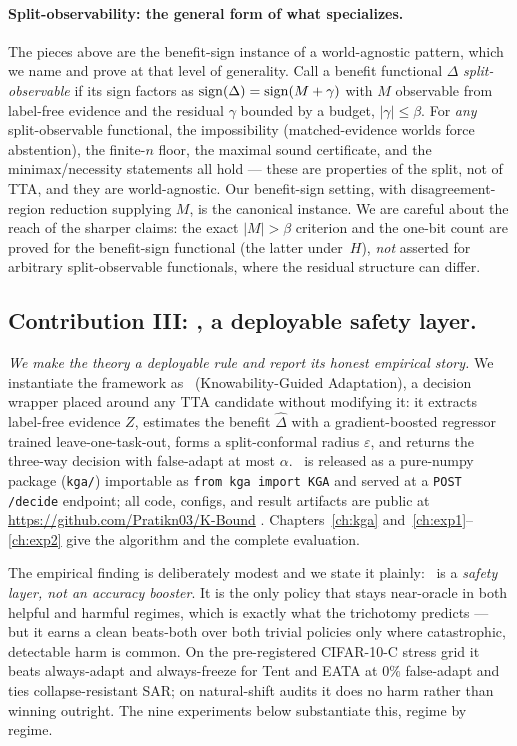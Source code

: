 \paragraph{Split-observability: the general form of what specializes.}
The pieces above are the benefit-sign instance of a world-agnostic pattern, which we
name and prove at that level of generality. Call a benefit functional $\Delta$
\emph{split-observable} if its sign factors as $\operatorname{sign}(\Delta) = \operatorname{sign}(M + \gamma)$ with
$M$ observable from label-free evidence and the residual $\gamma$ bounded by a budget,
$|\gamma| \le \beta$. For \emph{any} split-observable functional, the impossibility
(matched-evidence worlds force abstention), the finite-$n$ floor, the maximal sound
certificate, and the minimax/necessity statements all hold --- these are properties of
the split, not of TTA, and they are world-agnostic. Our benefit-sign setting, with
disagreement-region reduction supplying $M$, is the canonical instance. We are careful
about the reach of the sharper claims: the exact $|M| > \beta$ criterion and the
one-bit count are proved for the benefit-sign functional (the latter under~$H$),
\emph{not} asserted for arbitrary split-observable functionals, where the residual
structure can differ.

\subsection*{Contribution III: \KGA, a deployable safety layer.}

\emph{We make the theory a deployable rule and report its honest empirical
story.} We instantiate the framework as \KGA\ (Knowability-Guided Adaptation), a
decision wrapper placed around any TTA candidate without modifying it: it
extracts label-free evidence $Z$, estimates the benefit $\widehat{\Delta}$ with a
gradient-boosted regressor trained leave-one-task-out, forms a split-conformal
radius $\varepsilon$, and returns the three-way decision with false-adapt at most
$\alpha$. \KGA\ is released as a pure-numpy package (\texttt{kga/}) importable as
\texttt{from kga import KGA} and served at a \texttt{POST /decide} endpoint; all
code, configs, and result artifacts are public at
\url{https://github.com/Pratikn03/K-Bound} \cite{kbound2026repo}.
Chapters~\ref{ch:kga} and~\ref{ch:exp1}--\ref{ch:exp2} give the algorithm and the
complete evaluation.

The empirical finding is deliberately modest and we state it plainly: \KGA\ is a
\emph{safety layer, not an accuracy booster}. It is the only policy that stays
near-oracle in both helpful and harmful regimes, which is exactly what the
trichotomy predicts --- but it earns a clean beats-both over both trivial
policies only where catastrophic, detectable harm is common. On the
pre-registered CIFAR-10-C stress grid it beats always-adapt and always-freeze for
Tent and EATA at $0\%$ false-adapt and ties collapse-resistant SAR; on
natural-shift audits it does no harm rather than winning outright. The nine
experiments below substantiate this, regime by regime.


